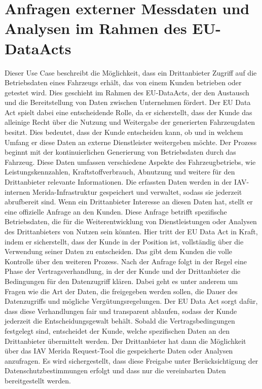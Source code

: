\section{Anfragen externer Messdaten und Analysen im Rahmen des EU-DataActs}
  Dieser Use Case beschreibt die Möglichkeit, dass ein Drittanbieter Zugriff auf die Betriebsdaten eines Fahrzeugs erhält, das von einem Kunden betrieben oder getestet wird. Dies geschieht im Rahmen des EU-DataActs, der den Austausch und die Bereitstellung von Daten zwischen Unternehmen fördert. Der EU Data Act spielt dabei eine entscheidende Rolle, da er sicherstellt, dass der Kunde das alleinige Recht über die Nutzung und Weitergabe der generierten Fahrzeugdaten besitzt.  \cite{bmdv2024} Dies bedeutet, dass der Kunde entscheiden kann, ob und in welchem Umfang er diese Daten an externe Dienstleister weitergeben möchte.
  \newline
  Der Prozess beginnt mit der kontinuierlichen Generierung von Betriebsdaten durch das Fahrzeug. Diese Daten umfassen verschiedene Aspekte des Fahrzeugbetriebs, wie Leistungskennzahlen, Kraftstoffverbrauch, Abnutzung und weitere für den Drittanbieter relevante Informationen. Die erfassten Daten werden in der IAV-internen Merida-Infrastruktur gespeichert und verwaltet, sodass sie jederzeit abrufbereit sind.
  \newline
  Wenn ein Drittanbieter Interesse an diesen Daten hat, stellt er eine offizielle Anfrage an den Kunden. Diese Anfrage betrifft spezifische Betriebsdaten, die für die Weiterentwicklung von Dienstleistungen oder Analysen des Drittanbieters von Nutzen sein könnten. Hier tritt der EU Data Act in Kraft, indem er sicherstellt, dass der Kunde in der Position ist, vollständig über die Verwendung seiner Daten zu entscheiden. Das gibt dem Kunden die volle Kontrolle über den weiteren Prozess.
  \newline
  \newline
  Nach der Anfrage folgt in der Regel eine Phase der Vertragsverhandlung, in der der Kunde und der Drittanbieter die Bedingungen für den Datenzugriff klären. Dabei geht es unter anderem um Fragen wie die Art der Daten, die freigegeben werden sollen, die Dauer des Datenzugriffs und mögliche Vergütungsregelungen. Der EU Data Act sorgt dafür, dass diese Verhandlungen fair und transparent ablaufen, sodass der Kunde jederzeit die Entscheidungsgewalt behält.
  \newline
  Sobald die Vertragsbedingungen festgelegt sind, entscheidet der Kunde, welche spezifischen Daten an den Drittanbieter übermittelt werden. Der Drittanbieter hat dann die Möglichkeit über das IAV Merida Request-Tool die gespeicherte Daten oder Analysen anzufragen. Es wird sichergestellt, dass diese Freigabe unter Berücksichtigung der Datenschutzbestimmungen erfolgt und dass nur die vereinbarten Daten bereitgestellt werden.

